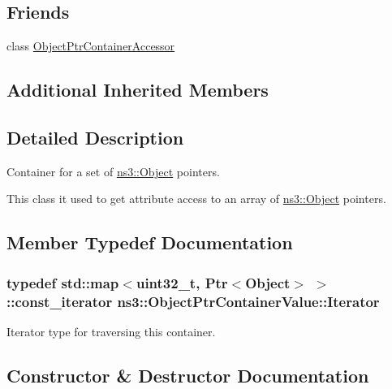 \subsection*{Friends}
\begin{DoxyCompactItemize}
\item 
class \hyperlink{classns3_1_1ObjectPtrContainerValue_a50531b6c792ec039bad8a2ea5a92deb8}{Object\+Ptr\+Container\+Accessor}
\end{DoxyCompactItemize}
\subsection*{Additional Inherited Members}


\subsection{Detailed Description}
Container for a set of \hyperlink{classns3_1_1Object}{ns3\+::\+Object} pointers. 

This class it used to get attribute access to an array of \hyperlink{classns3_1_1Object}{ns3\+::\+Object} pointers. 

\subsection{Member Typedef Documentation}
\subsubsection[{\texorpdfstring{Iterator}{Iterator}}]{\setlength{\rightskip}{0pt plus 5cm}typedef std\+::map$<$uint32\+\_\+t, {\bf Ptr}$<${\bf Object}$>$ $>$\+::const\+\_\+iterator {\bf ns3\+::\+Object\+Ptr\+Container\+Value\+::\+Iterator}}\hypertarget{classns3_1_1ObjectPtrContainerValue_a1f0661f9cf3626d62a4623f36b672876}{}\label{classns3_1_1ObjectPtrContainerValue_a1f0661f9cf3626d62a4623f36b672876}
Iterator type for traversing this container. 

\subsection{Constructor \& Destructor Documentation}
